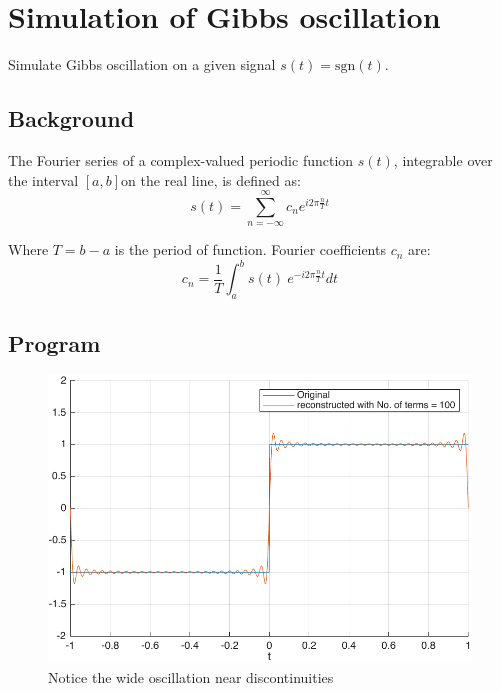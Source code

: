 \pagebreak
\section{Simulation of Gibbs oscillation}
Simulate Gibbs oscillation on a given signal $s(t) = \text{sgn}(t)$.

\subsection*{Background}
The Fourier series of a complex-valued periodic function $s(t)$, integrable over the interval $[a, b]$on the real line, is defined as: 
$$s(t) = \sum _{n=-\infty }^{\infty }c_{n}e^{i2\pi {\tfrac {n}{T}}t}$$

Where $T = b - a$ is the period of function. Fourier coefficients $c_{n}$ are: 
$$c_{n}={\frac {1}{T}}\int _{a}^{b}s(t)\ e^{-i2\pi {\tfrac {n}{T}}t}dt$$


\subsection*{Program}

\begin{figure}[ht!]
	\centering
	\includegraphics[width=.5\textwidth]{img/Q4.pdf}
	\caption*{Notice the wide oscillation near discontinuities}
\end{figure}